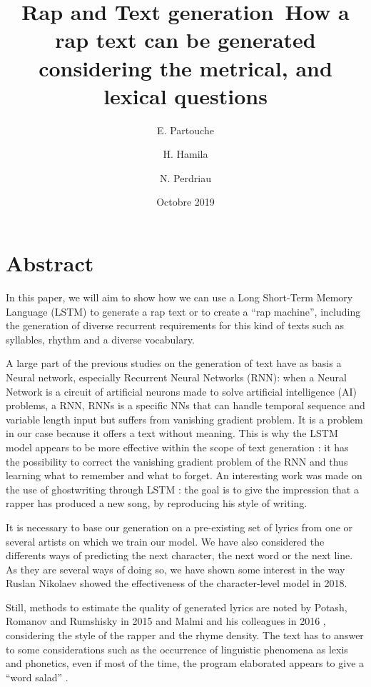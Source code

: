 \documentclass[12pt,a4paper]{article}
\title{Rap and Text generation\newline\ How a rap text can be generated considering the metrical, and lexical questions}
\date{Octobre 2019}
\author{E. Partouche \and H. Hamila \and N. Perdriau}
\begin{document}
\maketitle
\tableofcontents
\newpage

\section{Abstract}

In this paper, we will aim to show how we can use a Long Short-Term Memory Language (LSTM) to generate a rap text or to create a “rap machine”, including the generation of diverse recurrent requirements for this kind of texts such as syllables, rhythm and a diverse vocabulary. \newline

A large part of the previous studies on the generation of text \cite{sutskever_generating_nodate} have as basis a Neural network, especially Recurrent Neural Networks (RNN): when a Neural Network is a circuit of artificial neurons made to solve artificial intelligence (AI) problems, a RNN, RNNs is a specific NNs that can handle temporal sequence and variable length input but suffers from vanishing gradient problem. It is a problem in our case because it offers a text without meaning. This is why the LSTM model appears to be more effective within the scope of text generation \cite{chollet_deep_2018} \cite{raiman_nano_2015} \cite{surma_text_2018} : it has the possibility to correct the vanishing gradient problem of the RNN and thus learning what to remember and what to forget. An interesting work was made on the use of ghostwriting through LSTM  \cite{potash_ghostwriter:_2015} : the goal is to give the impression that a rapper has produced a new song, by reproducing his style of writing. \newline

It is necessary to base our generation on a pre-existing set of lyrics from one or several artists on which we train our model. We have also considered the differents ways of predicting the next character, the next word or the next line. As they are several ways of doing so, we have shown some interest in the way Ruslan Nikolaev \cite{nikolaev_generating_2018} \cite{nikolaev_drake-lyric-generator_2018} showed the effectiveness of the character-level model in 2018. \newline

Still, methods to estimate the quality of generated lyrics are noted by Potash, Romanov and Rumshisky in 2015 and Malmi and his colleagues in 2016 \cite{malmi_dopelearning:_2016}, considering the style of the rapper and the rhyme density. The text has to answer to some considerations such as the occurrence of linguistic phenomena as lexis and phonetics, even if most of the time, the program elaborated appears to give a “word salad”   \cite{oliveira_automatic_nodate} \cite{paupier_how_2018}. \newline
\end{document}
